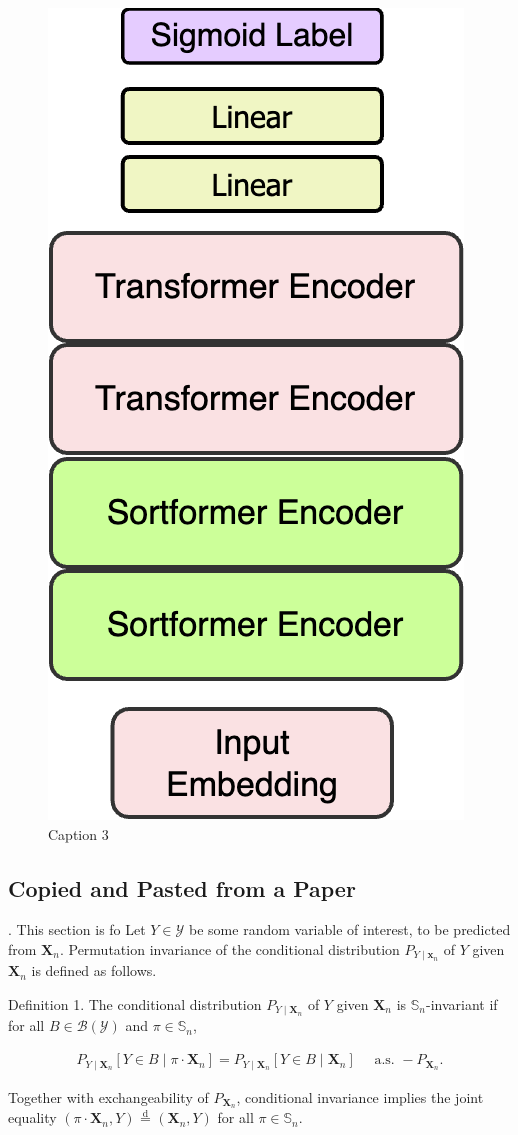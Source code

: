 \documentclass{article}
\begin{document}
\begin{figure}[ht]
\begin{minipage}[b]{0.33\textwidth}
    \includegraphics[width=0.5\linewidth]{pics/SortFormer_example.drawio.png}
    \caption{Caption 3}
    \label{fig:subim3}
  \end{minipage}
\end{figure}


\subsection{Copied and Pasted from a Paper}
\cite{bloem2018neural}. This section is fo
Let $Y \in \mathcal{Y}$ be some random variable of interest, to be predicted from $\mathbf{X}_n$. Permutation invariance of the conditional distribution $P_{Y \mid \mathbf{x}_n}$ of $Y$ given $\mathbf{X}_n$ is defined as follows.

Definition 1. The conditional distribution $P_{Y \mid \mathbf{X}_n}$ of $Y$ given $\mathbf{X}_n$ is $\mathbb{S}_n$-invariant if for all $B \in \mathcal{B}(\mathcal{Y})$ and $\pi \in \mathbb{S}_n$,

\begin{align}
  P_{Y \mid \mathbf{X}_n}\left[Y \in B \mid \pi \cdot \mathbf{X}_n\right]=P_{Y \mid \mathbf{X}_n}\left[Y \in B \mid \mathbf{X}_n\right] \quad \text { a.s. }-P_{\mathbf{X}_n} .
\end{align}

Together with exchangeability of $P_{\mathbf{X}_n}$, conditional invariance implies the joint equality $\left(\pi \cdot \mathbf{X}_n, Y\right) \stackrel{\text { d }}{=}\left(\mathbf{X}_n, Y\right)$ for all $\pi \in \mathbb{S}_n$.
\end{document}
